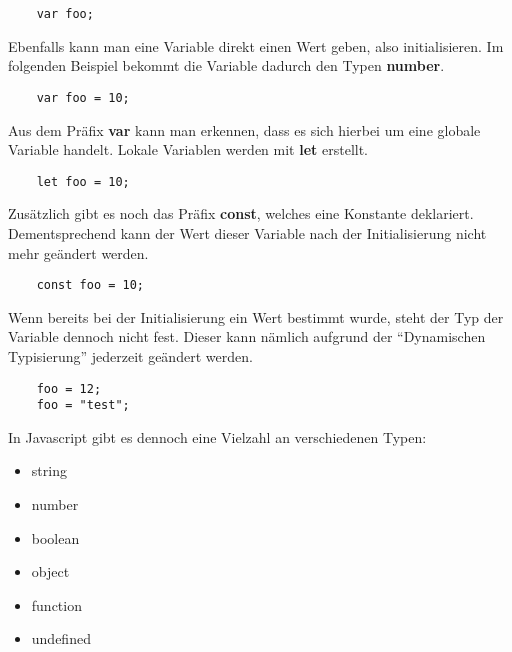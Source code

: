 \begin{lstlisting}
    var foo;
\end{lstlisting}

Ebenfalls kann man eine Variable direkt einen Wert geben, also initialisieren. Im folgenden Beispiel bekommt die Variable dadurch den Typen \textbf{number}.

\begin{lstlisting}
    var foo = 10;
\end{lstlisting}

Aus dem Präfix \textbf{var} kann man erkennen, dass es sich hierbei um eine globale Variable handelt. Lokale Variablen werden mit \textbf{let} erstellt.

\begin{lstlisting}
    let foo = 10;
\end{lstlisting}

Zusätzlich gibt es noch das Präfix \textbf{const}, welches eine Konstante deklariert. Dementsprechend kann der Wert dieser Variable nach der Initialisierung nicht mehr geändert werden.

\begin{lstlisting}
    const foo = 10;
\end{lstlisting}

Wenn bereits bei der Initialisierung ein Wert bestimmt wurde, steht der Typ der Variable dennoch nicht fest. Dieser kann nämlich aufgrund der “Dynamischen Typisierung” jederzeit geändert werden.

\begin{lstlisting}
    foo = 12;
    foo = "test";
\end{lstlisting}

In Javascript gibt es dennoch eine Vielzahl an verschiedenen Typen:

\begin{itemize}
  \item string
  \item number
  \item boolean
  \item object
  \item function
  \item undefined
\end{itemize}

\cite{frontend_web_javascript}
